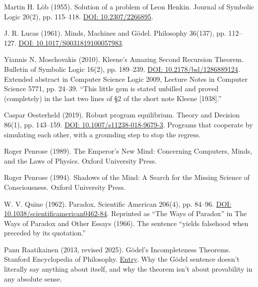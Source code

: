\documentclass[11pt,twoside]{article}
\theoremstyle{thielethm}
\theoremstyle{thieledef}
\theoremstyle{thieledef}
\theoremstyle{thieledef}
\theoremstyle{thielethm}
\theoremstyle{thieleobs}
\theoremstyle{thielethm}
\begin{document}
\noindent Martin H. L\"ob (1955). Solution of a problem of Leon Henkin. Journal of Symbolic Logic 20(2), pp. 115--118. \href{https://doi.org/10.2307/2266895}{DOI: 10.2307/2266895}.
\par\medskip

\noindent J. R. Lucas (1961). Minds, Machines and G\"odel. Philosophy 36(137), pp. 112--127. \href{https://doi.org/10.1017/S0031819100057983}{DOI: 10.1017/S0031819100057983}.
\par\medskip

\noindent Yiannis N. Moschovakis (2010). Kleene's Amazing Second Recursion Theorem. Bulletin of Symbolic Logic 16(2), pp. 189--239. \href{https://doi.org/10.2178/bsl/1286889124}{DOI: 10.2178/bsl/1286889124}. Extended abstract in Computer Science Logic 2009, Lecture Notes in Computer Science 5771, pp. 24--39. ``This little gem is stated unbilled and proved (completely) in the last two lines of \S2 of the short note Kleene [1938].''
\par\medskip

\noindent Caspar Oesterheld (2019). Robust program equilibrium. Theory and Decision 86(1), pp. 143--159. \href{https://doi.org/10.1007/s11238-018-9679-3}{DOI: 10.1007/s11238-018-9679-3}. Programs that cooperate by simulating each other, with a grounding step to stop the regress.
\par\medskip

\noindent Roger Penrose (1989). The Emperor's New Mind: Concerning Computers, Minds, and the Laws of Physics. Oxford University Press.
\par\medskip

\noindent Roger Penrose (1994). Shadows of the Mind: A Search for the Missing Science of Consciousness. Oxford University Press.
\par\medskip

\noindent W. V. Quine (1962). Paradox. Scientific American 206(4), pp. 84--96. \href{https://doi.org/10.1038/scientificamerican0462-84}{DOI: 10.1038/scientificamerican0462-84}. Reprinted as ``The Ways of Paradox'' in The Ways of Paradox and Other Essays (1966). The sentence ``yields falsehood when preceded by its quotation.''
\par\medskip

\noindent Panu Raatikainen (2013, revised 2025). G\"odel's Incompleteness Theorems. Stanford Encyclopedia of Philosophy. \href{https://plato.stanford.edu/entries/goedel-incompleteness/}{Entry}. Why the G\"odel sentence doesn't literally say anything about itself, and why the theorem isn't about provability in any absolute sense.
\par\medskip
\end{document}
